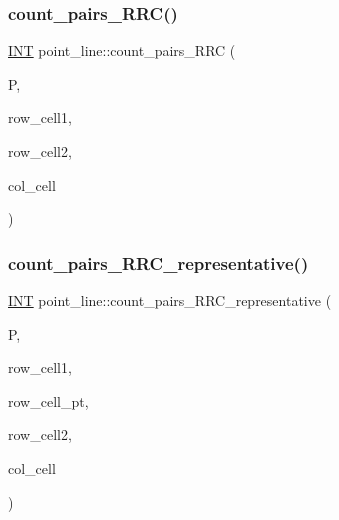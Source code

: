 \mbox{\label{classpoint__line_a9ca1a17c458a29704d5d4efbb9b9a948}} 
\subsubsection{\texorpdfstring{count\+\_\+pairs\+\_\+\+R\+R\+C()}{count\_pairs\_RRC()}}
{\footnotesize\ttfamily \mbox{\hyperlink{galois_8h_a09fddde158a3a20bd2dcadb609de11dc}{I\+NT}} point\+\_\+line\+::count\+\_\+pairs\+\_\+\+R\+RC (\begin{DoxyParamCaption}\item[{\mbox{\hyperlink{classpartitionstack}{partitionstack}} \&}]{P,  }\item[{\mbox{\hyperlink{galois_8h_a09fddde158a3a20bd2dcadb609de11dc}{I\+NT}}}]{row\+\_\+cell1,  }\item[{\mbox{\hyperlink{galois_8h_a09fddde158a3a20bd2dcadb609de11dc}{I\+NT}}}]{row\+\_\+cell2,  }\item[{\mbox{\hyperlink{galois_8h_a09fddde158a3a20bd2dcadb609de11dc}{I\+NT}}}]{col\+\_\+cell }\end{DoxyParamCaption})}

\mbox{\label{classpoint__line_a7d7f715852b55fff2670b138a3eff978}} 
\subsubsection{\texorpdfstring{count\+\_\+pairs\+\_\+\+R\+R\+C\+\_\+representative()}{count\_pairs\_RRC\_representative()}}
{\footnotesize\ttfamily \mbox{\hyperlink{galois_8h_a09fddde158a3a20bd2dcadb609de11dc}{I\+NT}} point\+\_\+line\+::count\+\_\+pairs\+\_\+\+R\+R\+C\+\_\+representative (\begin{DoxyParamCaption}\item[{\mbox{\hyperlink{classpartitionstack}{partitionstack}} \&}]{P,  }\item[{\mbox{\hyperlink{galois_8h_a09fddde158a3a20bd2dcadb609de11dc}{I\+NT}}}]{row\+\_\+cell1,  }\item[{\mbox{\hyperlink{galois_8h_a09fddde158a3a20bd2dcadb609de11dc}{I\+NT}}}]{row\+\_\+cell\+\_\+pt,  }\item[{\mbox{\hyperlink{galois_8h_a09fddde158a3a20bd2dcadb609de11dc}{I\+NT}}}]{row\+\_\+cell2,  }\item[{\mbox{\hyperlink{galois_8h_a09fddde158a3a20bd2dcadb609de11dc}{I\+NT}}}]{col\+\_\+cell }\end{DoxyParamCaption})}

